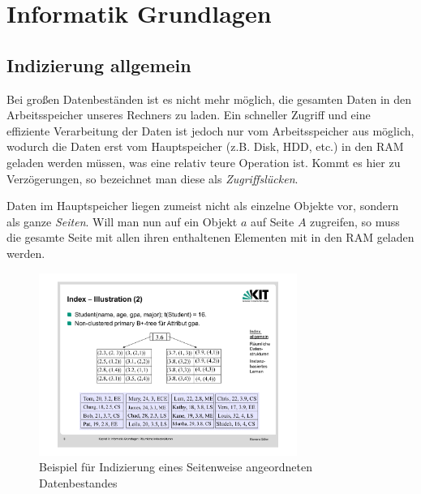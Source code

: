 \section{Informatik Grundlagen}

\subsection{Indizierung allgemein}
Bei großen Datenbeständen ist es nicht mehr möglich, die gesamten Daten in den
Arbeitsspeicher unseres Rechners zu laden. Ein schneller Zugriff und eine
effiziente Verarbeitung der Daten ist jedoch nur
vom Arbeitsspeicher aus möglich, wodurch die Daten erst vom Hauptspeicher (z.B. Disk,
HDD, etc.) in den RAM geladen werden müssen, was eine relativ teure Operation ist.
Kommt es hier zu Verzögerungen, so bezeichnet man diese als \textit{Zugriffslücken}.

Daten im Hauptspeicher liegen zumeist nicht als einzelne Objekte vor, sondern als
ganze \textit{Seiten}. Will man nun auf ein Objekt \(a\) auf Seite \(A\) zugreifen,
so muss die gesamte Seite mit allen ihren enthaltenen Elementen mit in den RAM geladen
werden.

\begin{figure}[ht]
	\centering
	\includegraphics[width=0.75\textwidth]{Figures/index_example}
	\caption[Indizierung Beispiel]{Beispiel für Indizierung eines Seitenweise angeordneten Datenbestandes \footnotemark}
	\label{fig:index_example}
\end{figure}

